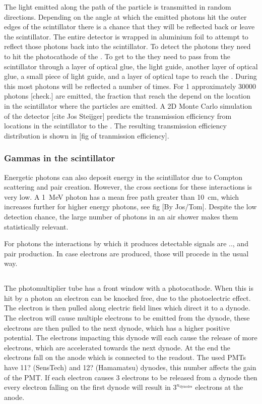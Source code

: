 The light emitted along the path of the particle is transmitted in random directions. Depending on the angle at which the emitted photons hit the outer edges of the scintillator there is a chance that they will be reflected back or leave the scintillator. The entire detector is wrapped in aluminium foil to attempt to reflect those photons back into the scintillator. To detect the photons they need to hit the photocathode of the \pmt. To get to the \pmt they need to pass from the scintillator through a layer of optical glue, the light guide, another layer of optical glue, a small piece of light guide, and a layer of optical tape to reach the \pmt. During this most photons will be reflected a number of times. For \SI{1}{\mip} approximately 30000 photons [check.] are emitted, the fraction that reach the \pmt depend on the location in the scintillator where the particles are emitted. A 2D Monte Carlo simulation of the detector [cite Jos Steijger] predicts the transmission efficiency from locations in the scintillator to the \pmt. The resulting transmission efficiency distribution is shown in [fig of tranmission efficiency].


\subsubsection{Gammas in the scintillator}

Energetic photons can also deposit energy in the scintillator due to Compton scattering and pair creation. However, the cross sections for these interactions is very low. A \SI{1}{\MeV} photon  has a mean free path greater than \SI{10}{\centi\meter}, which increases further for higher energy photons, see fig [By Jos/Tom]. Despite the low detection chance, the large number of photons in an air shower makes them statistically relevant.

For photons the interactions by which it produces detectable signals are .., and pair production. In case electrons are produced, those will procede in the usual way.


\subsection{\pmt}

The photomultiplier tube has a front window with a photocathode. When this is hit by a photon an electron can be knocked free, due to the photoelectric effect. The electron is then pulled along electric field lines which direct it to a dynode. The electron will cause multiple electrons to be emitted from the dynode, these electrons are then pulled to the next dynode, which has a higher positive potential. The electrons impacting this dynode will each cause the release of more electrons, which are accelerated towards the next dynode. At the end the electrons fall on the anode which is connected to the readout. The used PMTs have 11? (SensTech) and 12? (Hamamatsu) dynodes, this number affects the gain of the PMT. If each electron causes \num{3} electrons to be released from a dynode then every electron falling on the first dynode will result in $3^{n_{\mathrm{dynodes}}}$ electrons at the anode.

